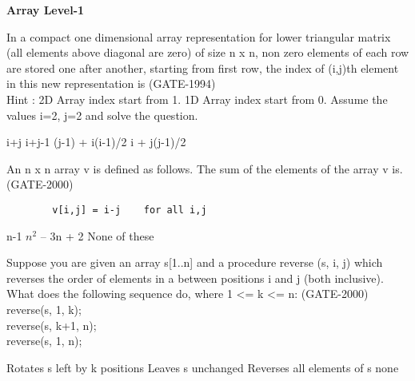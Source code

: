 \centerline{\textbf{ \LARGE Array Level-1}}

\begin{questyle}
  \question In a compact one dimensional array representation for lower triangular matrix (all elements above diagonal are zero) of
            size n x n, non zero elements of each row are stored one after another, starting from first row, the index of (i,j)th
            element in this new representation is  (GATE-1994) \\
            Hint : 2D Array index start from 1. 1D Array index start from 0. Assume the values i=2, j=2 and solve the question.
  \begin{choices}
    \choice         i+j
    \choice         i+j-1
    \CorrectChoice  (j-1) + i(i-1)/2
    \choice         i + j(j-1)/2
  \end{choices}
\end{questyle}

\begin{questyle}
  \question  An n x n array v is defined as follows. The sum of the elements of the array v is.  (GATE-2000)
    \begin{lstlisting}
        v[i,j] = i-j    for all i,j
    \end{lstlisting}
  \begin{choices}
    \choice         n-1
    \choice         \(n^2\) – 3n + 2
    \choice         None of these
  \end{choices}
\end{questyle}

\begin{questyle}
  \question  Suppose you are given an array s[1..n] and a procedure reverse (s, i, j) which reverses the order of
             elements in a between positions i and j (both inclusive). What does the following sequence do, where 1 <= k <= n:  (GATE-2000)\\
             reverse(s, 1, k); \\
             reverse(s, k+1, n); \\
             reverse(s, 1, n);
  \begin{choices}
    \CorrectChoice  Rotates s left by k positions
    \choice         Leaves s unchanged
    \choice         Reverses all elements of s
    \choice         none
  \end{choices}
\end{questyle}

